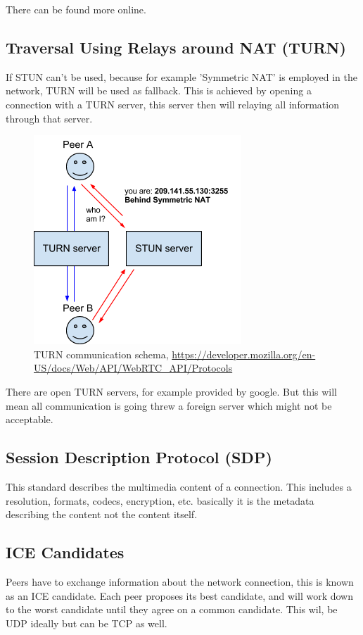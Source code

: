 There can be found more online.

\subsection{Traversal Using Relays around NAT (TURN)}
If STUN can't be used, because for example 'Symmetric NAT' is employed in the network, TURN will be used as fallback. This is achieved by opening a connection with a TURN server, this server then will relaying all information through that server.

\begin{figure}[H]
	\includegraphics[scale=0.5]{webrtc-turn.png}
	\centering
	\caption{TURN communication schema, \url{https://developer.mozilla.org/en-US/docs/Web/API/WebRTC_API/Protocols}}
	\label{fig:TURN}
\end{figure}

There are open TURN servers, for example provided by google. But this will mean all communication is going threw a foreign server which might not be acceptable.

\subsection{Session Description Protocol (SDP)}
This standard describes the multimedia content of a connection. This includes a resolution, formats, codecs, encryption, etc. basically it is the metadata describing the content not the content itself.

\subsection{ICE Candidates}
Peers have to exchange information about the network connection, this is known as an ICE candidate. Each peer proposes its best candidate, and will work down to the worst candidate until they agree on a common candidate. This wil, be UDP ideally but can be TCP as well.

